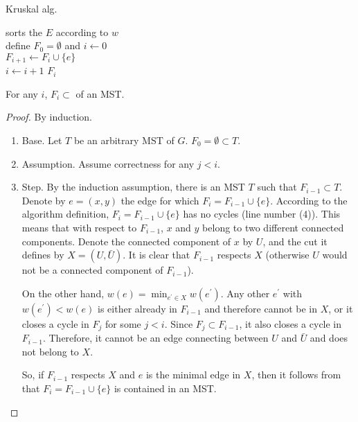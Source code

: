 \begin{algorithm} 
\SetAlgoLined
{}
\caption{ Kruskal alg.}
sorts the $E$ according to $w$ \\
define $F_{0} = \emptyset$ and $i \leftarrow 0$ \\
 {
   {
    $F_{i+1} \leftarrow F_{i} \cup \{e\}$ \\
    $i \leftarrow i + 1$
  }
}
\Return $F_{i}$
  \label{alg:krus}
\end{algorithm}

\begin{claim}
  For any $i$, $F_{i} \subset $ of an MST.
\end{claim}
\begin{proof}
  By induction. 
  \begin{enumerate}
    \item Base. Let $T$ be an arbitrary MST of $G$. $F_{0} = \emptyset \subset T $.
    \item Assumption. Assume correctness for any $j < i$. 
    \item Step. By the induction assumption, there is an MST $T$ such that $F_{i-1} \subset T$. Denote by $e=(x,y)$ the edge for which $F_{i} = F_{i-1}\cup \{e\}$. According to the algorithm definition, $F_{i} = F_{i-1} \cup \{e\}$ has no cycles (line number (4)). This means that with respect to $F_{i-1}$, $x$ and $y$ belong to two different connected components. Denote the connected component of $x$ by $U$, and the cut it defines by $X = (U, \bar{U})$. It is clear that $F_{i-1}$ respects $X$ (otherwise $U$ would not be a connected component of $F_{i-1}$).
      

On the other hand, $w(e) = \min_{e^{\prime} \in X}w(e^{\prime})$. Any other $e^{\prime}$ with $w(e^{\prime}) < w(e)$ is either already in $F_{i-1}$ and therefore cannot be in $X$, or it closes a cycle in $F_{j}$ for some $j<i$. Since $F_{j} \subset F_{i-1}$, it also closes a cycle in $F_{i-1}$. Therefore, it cannot be an edge connecting between $U$ and $\bar{U}$ and does not belong to $X$.


So, if $F_{i-1}$ respects $X$ and $e$ is the minimal edge in $X$, then it follows from  that $F_{i} = F_{i-1} \cup \{ e\}$ is contained in an MST.
  \end{enumerate}
\end{proof}


